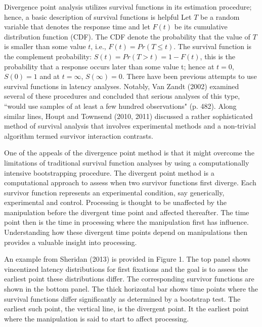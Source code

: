 \documentclass[man]{apa}%
\begin{document}
      Divergence point analysis utilizes survival functions in its estimation procedure; hence, a basic description of survival functions is helpful  Let $T$ be a random variable that denotes the response time and let $F(t)$ be its cumulative distribution function (CDF). The CDF denote the probability that the value of $T$ is smaller than some value $t$, i.e., $F(t)=Pr(T \leq t)$.  The survival function is the complement probability: $S(t)=Pr(T>t)=1-F(t)$, this is the probability that a response occurs later than some value t; hence at $t=0$, $S(0) = 1$ and at $t=\infty$, $S( \infty ) = 0$. There have been previous attempts to use survival functions in latency analyses.  Notably, Van Zandt (2002) examined several of these procedures and concluded that serious analyses of this type, ``would use samples of at least a few hundred observations" (p. 482). Along similar lines, Houpt and Townsend (2010, 2011) discussed a rather sophisticated method of survival analysis that involves experimental methods and a non-trivial algorithm termed survivor interaction contrasts.

       One of the appeals of the divergence point method is that it might overcome the limitations of traditional survival function analyses by using a computationally intensive bootstrapping procedure.  The divergent point method is a computational approach to assess when two survivor functions first diverge.  Each survivor function represents an experimental condition, say generically, experimental and control.  Processing is thought to be unaffected by the manipulation before the divergent time point and affected thereafter.  The time point then is the time in processing where the manipulation first has influence.  Understanding how these divergent time points depend on manipulations then provides a valuable insight into processing.

An example from Sheridan (2013) is provided in Figure 1.  The top panel shows vincentized latency distributions for first fixations and the goal is to assess the earliest point these distributions differ.  The corresponding survivor functions are shown in the bottom panel.  The thick horizontal bar shows time points where the survival functions differ significantly as determined by a bootstrap test.  The earliest such point, the vertical line, is the divergent point.  It the earliest point where the manipulation is said to start to affect processing.

       
       
\end{document}

